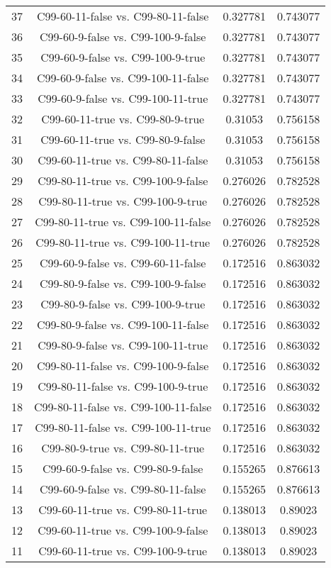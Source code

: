 \documentclass[a4paper,10pt]{article}
\begin{document}
\begin{landscape}
\begin{table}[!htp]
\begin{tabular}{cccc}
37&C99-60-11-false vs. C99-80-11-false&0.327781&0.743077\\
36&C99-60-9-false vs. C99-100-9-false&0.327781&0.743077\\
35&C99-60-9-false vs. C99-100-9-true&0.327781&0.743077\\
34&C99-60-9-false vs. C99-100-11-false&0.327781&0.743077\\
33&C99-60-9-false vs. C99-100-11-true&0.327781&0.743077\\
32&C99-60-11-true vs. C99-80-9-true&0.31053&0.756158\\
31&C99-60-11-true vs. C99-80-9-false&0.31053&0.756158\\
30&C99-60-11-true vs. C99-80-11-false&0.31053&0.756158\\
29&C99-80-11-true vs. C99-100-9-false&0.276026&0.782528\\
28&C99-80-11-true vs. C99-100-9-true&0.276026&0.782528\\
27&C99-80-11-true vs. C99-100-11-false&0.276026&0.782528\\
26&C99-80-11-true vs. C99-100-11-true&0.276026&0.782528\\
25&C99-60-9-false vs. C99-60-11-false&0.172516&0.863032\\
24&C99-80-9-false vs. C99-100-9-false&0.172516&0.863032\\
23&C99-80-9-false vs. C99-100-9-true&0.172516&0.863032\\
22&C99-80-9-false vs. C99-100-11-false&0.172516&0.863032\\
21&C99-80-9-false vs. C99-100-11-true&0.172516&0.863032\\
20&C99-80-11-false vs. C99-100-9-false&0.172516&0.863032\\
19&C99-80-11-false vs. C99-100-9-true&0.172516&0.863032\\
18&C99-80-11-false vs. C99-100-11-false&0.172516&0.863032\\
17&C99-80-11-false vs. C99-100-11-true&0.172516&0.863032\\
16&C99-80-9-true vs. C99-80-11-true&0.172516&0.863032\\
15&C99-60-9-false vs. C99-80-9-false&0.155265&0.876613\\
14&C99-60-9-false vs. C99-80-11-false&0.155265&0.876613\\
13&C99-60-11-true vs. C99-80-11-true&0.138013&0.89023\\
12&C99-60-11-true vs. C99-100-9-false&0.138013&0.89023\\
11&C99-60-11-true vs. C99-100-9-true&0.138013&0.89023\\

\end{tabular}
\end{table}
\end{landscape}
\end{document}
